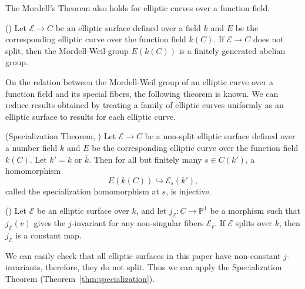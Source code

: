 \documentclass[main]{subfiles}
\begin{document}
The Mordell's Theorem also holds for elliptic curves over a function field.
\begin{thm}{(\cite[Theorem 6.1.]{ref:advancedaec})}
    \label{thm:mordell_function_field}
    Let $\mathcal{E} \to C$ be an elliptic surface defined over a field $k$ and $E$ be the corresponding elliptic curve over the function field $k(C)$.
    If $\mathcal{E} \to C$ does not split, then the Mordell-Weil group $E(k(C))$ is a finitely generated abelian group.
\end{thm}

On the relation between the Mordell-Weil group of an elliptic curve over a function field and its special fibers, the following theorem is known.
We can reduce results obtained by treating a family of elliptic curves uniformly as an elliptic surface to results for each elliptic curve.
\begin{thm}{(Specialization Theorem, \cite[Theorem 11.4.]{ref:advancedaec})}
    \label{thm:specialization}
    Let $\mathcal{E} \to C$ be a non-split elliptic surface defined over a number field $k$ and $E$ be the corresponding elliptic curve over the function field $k(C)$.
    Let $k'=k$ or $\overline{k}$.
    Then for all but finitely many $s \in C(k')$, a homomorphism
    \begin{equation*}
        E(k(C)) \hookrightarrow \mathcal{E}_{s}(k'),
    \end{equation*}
    called the specialization homomorphism at $s$, is injective.
\end{thm}

\begin{lem}{(\cite[Exercise 3.9.(a)]{ref:advancedaec})}
    Let $\mathcal{E}$ be an elliptic surface over $k$, and let $j_{\mathcal{E}}: C \to \mathbb{P}^1$ be a morphism such that $j_{\mathcal{E}}(v)$ gives the $j$-invariant for any non-singular fibers $\mathcal{E}_v$.
    If $\mathcal{E}$ splits over $k$, then $j_{\mathcal{E}}$ is a constant map.
\end{lem}

\begin{rem}
    We can easily check that all elliptic surfaces in this paper have non-constant $j$-invariants, therefore, they do not split.
    Thus we can apply the Specialization Theorem (Theorem~\ref{thm:specialization}).
\end{rem}
\end{document}

